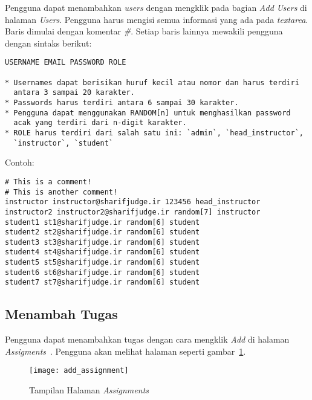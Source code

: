 Pengguna dapat menambahkan \textit{users} dengan mengklik pada bagian \textit{Add Users} di halaman \textit{Users}. Pengguna harus mengisi semua informasi yang ada pada \textit{textarea}. Baris dimulai dengan komentar \textit{\#}. Setiap baris lainnya mewakili pengguna dengan sintaks berikut:
\begin{lstlisting}[backgroundcolor = \color{lightgray}]
USERNAME EMAIL PASSWORD ROLE
	
* Usernames dapat berisikan huruf kecil atau nomor dan harus terdiri 
  antara 3 sampai 20 karakter.
* Passwords harus terdiri antara 6 sampai 30 karakter.
* Pengguna dapat menggunakan RANDOM[n] untuk menghasilkan password 
  acak yang terdiri dari n-digit karakter.
* ROLE harus terdiri dari salah satu ini: `admin`, `head_instructor`, 
  `instructor`, `student`
\end{lstlisting}
Contoh:
\begin{lstlisting}[backgroundcolor = \color{lightgray}]
# This is a comment!
# This is another comment!
instructor instructor@sharifjudge.ir 123456 head_instructor
instructor2 instructor2@sharifjudge.ir random[7] instructor
student1 st1@sharifjudge.ir random[6] student
student2 st2@sharifjudge.ir random[6] student
student3 st3@sharifjudge.ir random[6] student
student4 st4@sharifjudge.ir random[6] student
student5 st5@sharifjudge.ir random[6] student
student6 st6@sharifjudge.ir random[6] student
student7 st7@sharifjudge.ir random[6] student
\end{lstlisting}

\subsection{Menambah Tugas}
Pengguna dapat menambahkan tugas dengan cara mengklik \textit{Add} di halaman \textit{Assigments}~\cite{mjnaderi:14:sharifjudgedoc}. Pengguna akan melihat halaman seperti gambar~\ref{fig:addass}.
\begin{figure}[H]
	\centering  
	\texttt{[image: add\_assignment]}  
	\caption[Tampilan Halaman \textit{Assignments}]{Tampilan Halaman \textit{Assignments}} 
	\label{fig:addass} 
\end{figure} 

